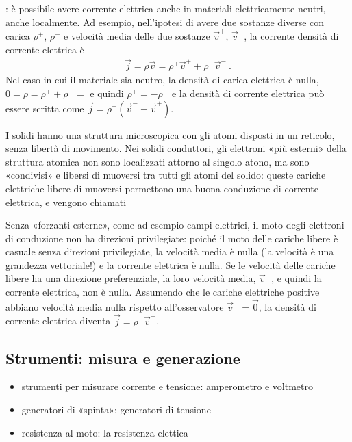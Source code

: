 \documentclass[letterpaper,10pt,italian]{jupyterBook}
\begin{document}
\sphinxAtStartPar
{}: è possibile avere corrente elettrica anche in materiali elettricamente neutri, anche localmente. Ad esempio, nell’ipotesi di avere due sostanze diverse con carica \(\rho^+\), \(\rho^-\) e velocità media delle due sostanze \(\vec{v}^+\), \(\vec{v}^-\), la corrente densità di corrente elettrica è
\begin{equation*}
\begin{split}\vec{j} = \rho \vec{v} = \rho^+ \vec{v}^+ + \rho^- \vec{v}^- \ . \end{split}
\end{equation*}
\sphinxAtStartPar
Nel caso in cui il materiale sia neutro, la densità di carica elettrica è nulla, \(0 = \rho = \rho^+ + \rho^- =\) e quindi \(\rho^+ = - \rho^-\) e la densità di corrente elettrica può essere scritta come \(\vec{j} = \rho^- (\vec{v}^- - \vec{v}^+)\).

\sphinxAtStartPar
{} I solidi hanno una struttura microscopica con gli atomi disposti in un reticolo, senza libertà di movimento. Nei solidi conduttori, gli elettroni «più esterni» della struttura atomica non sono localizzati attorno al singolo atono, ma sono «condivisi» e libersi di muoversi tra tutti gli atomi del solido: queste cariche elettriche libere di muoversi permettono una buona conduzione di corrente elettrica, e vengono chiamati 

\sphinxAtStartPar
Senza «forzanti esterne», come ad esempio campi elettrici, il moto degli elettroni di conduzione non ha direzioni privilegiate: poiché il moto delle cariche libere è casuale senza direzioni privilegiate, la velocità media è nulla (la velocità è una grandezza vettoriale!) e la corrente elettrica è nulla. Se le velocità delle cariche libere ha una direzione preferenziale, la loro velocità media, \(\vec{v}^-\), e quindi la corrente elettrica, non è nulla. Assumendo che le cariche elettriche positive abbiano velocità media nulla rispetto all’osservatore \(\vec{v}^+ = \vec{0}\), la densità di corrente elettrica diventa \(\vec{j} = \rho^- \vec{v}^-\).






\subsection{Strumenti: misura e generazione}
\label{\detokenize{ch/electromagnetism/electric-current:strumenti-misura-e-generazione}}
\sphinxAtStartPar
{}
\begin{itemize}
\item {} 
\sphinxAtStartPar
strumenti per misurare corrente e tensione: amperometro e voltmetro

\item {} 
\sphinxAtStartPar
generatori di «spinta»: generatori di tensione

\item {} 
\sphinxAtStartPar
resistenza al moto: la resistenza elettica

\end{itemize}
\end{document}
